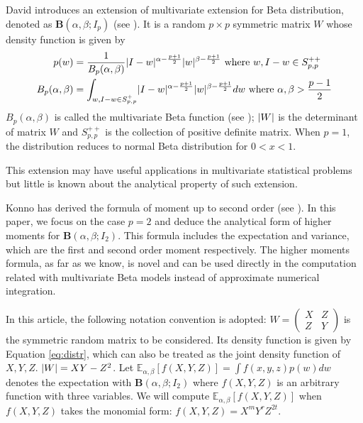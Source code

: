 \documentclass{elsarticle}
\DeclarePairedDelimiter\abs{\lvert}{\rvert}
\def\E{\mathbb{E}}
\begin{document}
David introduces an extension of
multivariate extension for Beta distribution,
denoted as $\mathbf{B}(\alpha, \beta; I_p)$ (see \cite{david1981}).
It is a random $p\times p$  symmetric matrix $W$ whose density
function is given by
\begin{align}
p(w) &= \frac{1}{B_p(\alpha, \beta)}\abs{I-w}^{\alpha-\frac{p+1}{2}}
\abs{w}^{\beta-\frac{p+1}{2}} \textrm{ where } w, I-w \in S_{p,p}^{++}
\label{eq:distr}\\
B_p(\alpha, \beta) &= \int_{w,I-w \in S_{p,p}^{+} }\abs{I-w}^{\alpha-\frac{p+1}{2}}
\abs{w}^{\beta-\frac{p+1}{2}}dw \textrm{ where } \alpha, \beta > \frac{p-1}{2}
\end{align}
$B_p(\alpha, \beta)$ is called the multivariate Beta function (see \cite{siegel_1935}); 
$\abs{W}$ is the determinant of matrix $W$ and $S_{p,p}^{++}$ is the 
collection of positive
definite matrix.
When $p=1$, the distribution reduces to normal Beta distribution for
$0<x<1$.

This extension may have useful applications in multivariate statistical
problems but little is known about the analytical property of such extension.

Konno has derived the formula of moment up to second order (see \cite{konno_1988}).
In this paper, we focus on the case $p=2$ and deduce the analytical form of 
higher moments for $\mathbf{B}(\alpha, \beta; I_2)$.
This formula
includes the expectation and variance, which are the first and second
order moment respectively. The higher moments formula, as
far as we know, is novel and can be used directly in the computation
related with multivariate Beta models instead of approximate
numerical integration.

In this article, the following notation convention is adopted:
$W=\begin{pmatrix} X & Z \\ Z & Y \end{pmatrix}$ is the symmetric random
matrix to be considered. Its density function is given by Equation \eqref{eq:distr}, which can
also be treated as the joint density function of $X,Y,Z$.
$\abs{W}=XY-Z^2$.
Let $\E_{\alpha,\beta}[f(X,Y, Z)] = \int f(x,y,z)p(w)dw$ denotes the expectation
with $\mathbf{B}(\alpha, \beta;I_2)$ where $f(X, Y, Z)$ is an arbitrary function with three
variables. We will compute $\E_{\alpha,\beta}[f(X,Y, Z)]$
when $f(X,Y,Z)$ takes the monomial form: $f(X,Y,Z)=X^m Y^r Z^{2t}$.
\end{document}
